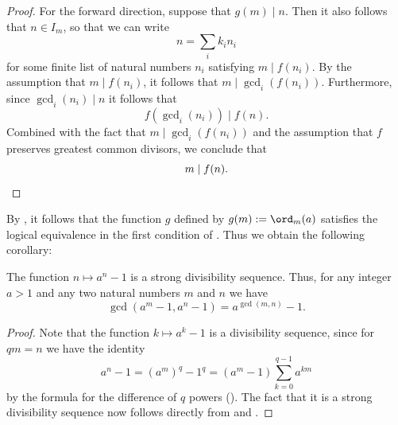\begin{proof}
  For the forward direction, suppose that $g(m)\mid n$. Then it also follows that $n\in I_m$, so that we can write
  \begin{equation*}
    n=\sum_i k_in_i
  \end{equation*}
  for some finite list of natural numbers $n_i$ satisfying $m\mid f(n_i)$. By the assumption that $m\mid f(n_i)$, it follows that $m\mid\gcd_i(f(n_i))$. Furthermore, since $\gcd_i(n_i)\mid n$ it follows that
  \begin{equation*}
    f(\gcd\nolimits_i(n_i))\mid f(n).
  \end{equation*}
  Combined with the fact that $m\mid\gcd_i(f(n_i))$ and the assumption that $f$ preserves greatest common divisors, we conclude that
  \begin{equation*}
    m\mid f(n).\qedhere
  \end{equation*}
\end{proof}

By , it follows that the function $g$ defined by $g(m):=\ord_m(a)$ satisfies the logical equivalence in the first condition of . Thus we obtain the following corollary:

\begin{corollary}
  The function $n\mapsto a^n-1$ is a strong divisibility sequence. Thus, for any integer $a>1$ and any two natural numbers $m$ and $n$ we have
  \begin{equation*}
    \gcd(a^m-1,a^n-1)=a^{\gcd(m,n)}-1.
  \end{equation*}
\end{corollary}

\begin{proof}
  Note that the function $k\mapsto a^k-1$ is a divisibility sequence, since for $qm=n$ we have the identity
  \begin{equation*}
    a^n-1=(a^m)^q-1^q=(a^m-1)\sum_{k=0}^{q-1}a^{km}
  \end{equation*}
  by the formula for the difference of $q$\supth{} powers (). The fact that it is a strong divisibility sequence now follows directly from  and .
\end{proof}

